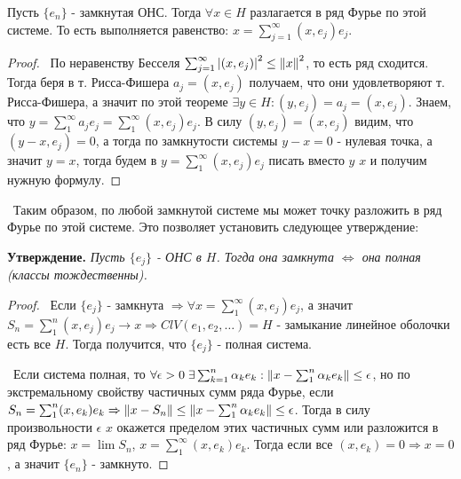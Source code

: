 \bigskip
\begin{theorem*}
Пусть $\{ e_n\}$ - замкнутая ОНС. Тогда $\forall x \in H$ разлагается в ряд Фурье по этой системе. То есть выполняется равенство: $x = \sum_{j = 1}^\infty (x, e_j)e_j$.
\end{theorem*}

\begin{proof}
\smallskip\par\noindent \textbullet~По неравенству Бесселя $\sum_{j = 1}^\infty \left\lvert(x, e_j)\right\rvert^2 \le \left\lVert x\right\rVert^2$, то есть ряд сходится. Тогда беря в т. Рисса-Фишера $a_j 
= (x, e_j)$ получаем, что они удовлетворяют т. Рисса-Фишера, а значит по этой теореме $\exists y \in H : (y, e_j) = a_j = (x, e_j)$. Знаем, что $y = \sum_1^\infty a_j e_j
= \sum_1^\infty (x, e_j) e_j$. В силу $(y, e_j) = (x, e_j)$ видим, что $(y - x, e_j) = 0$, а тогда по замкнутости системы $y - x = 0$ - нулевая точка, а значит $y = x$,
тогда будем в $y = \sum_1^\infty (x, e_j) e_j$ писать вместо $y$ $x$ и получим нужную формулу. 
\end{proof}

\medskip
\noindent \textbullet~Таким образом, по любой замкнутой системе мы может точку разложить в ряд Фурье по этой системе. Это позволяет установить следующее утверждение:

\bigskip
\noindent \textbf{Утверждение.} \textit{ Пусть $\{ e_j \}$ - ОНС в $H$. Тогда она замкнута $\Longleftrightarrow$ она полная (классы тождественны).}

\begin{proof}
\smallskip
\par\noindent \textbullet~Если $\{ e_j \}$ - замкнута $\Rightarrow \forall x = \sum_1^\infty (x, e_j) e_j$, а значит $S_n = \sum_1^n (x, e_j) e_j \to x \Rightarrow 
Cl V(e_1, e_2, \dots) = H$ - замыкание линейное оболочки есть все $H$. Тогда получится, что $ \{ e_j\}$ - полная система.

\medskip
\noindent \textbullet~Если система полная, то $\forall \epsilon > 0 \; \exists \sum_{k = 1}^n \alpha_k e_k : \left\lVert x - \sum_1^n \alpha_k e_k\right\rVert \le \epsilon$, но по 
экстремальному свойству частичных сумм ряда Фурье, если $S_n = \sum_1^n (x, e_k)e_k \Rightarrow \left\lVert x - S_n\right\rVert \le \left\lVert x - \sum_1^n \alpha_k e_k\right\rVert \le \epsilon$. Тогда 
в силу произвольности $\epsilon$ $x$ окажется пределом этих частичных сумм или разложится в ряд Фурье: $x = \lim S_n$, $x = \sum_1^\infty (x, e_k) e_k$. Тогда если 
все $(x, e_k) = 0 \Rightarrow x = 0$, а значит $\{ e_n\}$ - замкнуто.
\end{proof}


